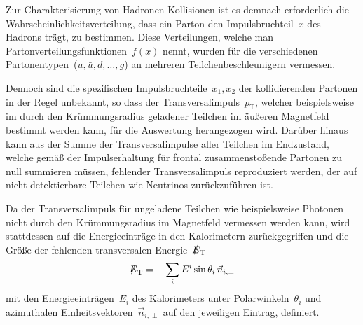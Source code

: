 \documentclass[11pt, a4paper]{article}
\numberwithin{equation}{section}
\begin{document}
Zur Charakterisierung von Hadronen-Kollisionen ist es demnach erforderlich die Wahrscheinlichkeitsverteilung, dass ein Parton den Impulsbruchteil~$x$ des Hadrons trägt, zu bestimmen.
Diese Verteilungen, welche man Partonverteilungsfunktionen~$f(x)$ nennt, wurden für die verschiedenen Partonentypen~($u, \bar{u}, d, \dots, g$) an mehreren Teilchenbeschleunigern vermessen.

Dennoch sind die spezifischen Impulsbruchteile~$x_1, x_2$ der kollidierenden Partonen in der Regel unbekannt, so dass der Transversalimpuls~$p_\mathrm{T}$, welcher beispielsweise im durch den Krümmungsradius geladener Teilchen im äußeren Magnetfeld bestimmt werden kann, für die Auswertung herangezogen wird.
Darüber hinaus kann aus der Summe der Transversalimpulse aller Teilchen im Endzustand, welche gemäß der Impulserhaltung für frontal zusammenstoßende Partonen zu null summieren müssen, fehlender Transversalimpuls reproduziert werden, der auf nicht-detektierbare Teilchen wie Neutrinos zurückzuführen ist.

Da der Transversalimpuls für ungeladene Teilchen wie beispielsweise Photonen nicht durch den Krümmungsradius im Magnetfeld vermessen werden kann, wird stattdessen auf die Energieeinträge in den Kalorimetern zurückgegriffen und die Größe der fehlenden transversalen Energie~$\slashed{E}_\mathrm{T}$
\begin{align*}
	\slashed{E}_\mathrm{T} = - \sum_{i} E^i \sin\theta_i \, \vec{n}_{i,\perp}
\end{align*}
mit den Energieeinträgen~$E_i$ des Kalorimeters unter Polarwinkeln~$\theta_i$  und azimuthalen Einheitsvektoren~$\vec{n}_{i,\perp}$ auf den jeweiligen Eintrag, definiert.
\end{document}
